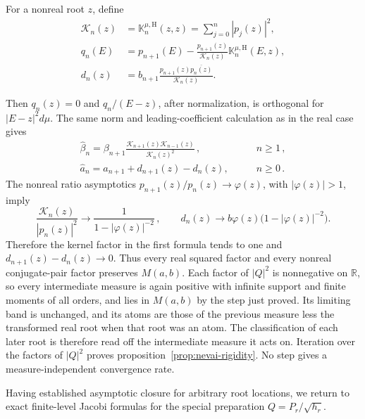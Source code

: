 \documentclass[a4paper,11pt]{article}
\def\dd{d}%
\theoremstyle{definition}
\theoremstyle{remark}
\newcommand{\dd}{\mathrm d}
\newcommand{\RR}{\mathbb R}
\begin{document}
For a nonreal root $z$, define
\begin{equation}
\begin{aligned}
   \mathcal K_n(z)&=\mathbb K_n^{\mu,\mathrm H}(z,z)=\sum_{j=0}^n|p_j(z)|^2,\\
   q_n(E)&=p_{n+1}(E)
      -\frac{p_{n+1}(z)}{\mathcal K_n(z)}
       \mathbb K_n^{\mu,\mathrm H}(E,z),\\
   d_n(z)&=b_{n+1}
      \frac{p_{n+1}(z)\overline{p_n(z)}}{\mathcal K_n(z)}.
\end{aligned}
   \label{eq:all-root-complex-kernel-app}
\end{equation}

Then $q_n(z)=0$ and $q_n/(E-z)$, after normalization, is orthogonal for
$|E-z|^2\dd\mu$.  The same norm and leading-coefficient calculation as in the real case gives
\begin{equation}
\begin{aligned}
   \widehat\beta_n
   =\beta_{n+1}\frac{\mathcal K_{n+1}(z)\mathcal K_{n-1}(z)}
      {\mathcal K_n(z)^2}\,,
   &\qquad n\ge1\,,\\
   \widehat a_n=a_{n+1}+d_{n+1}(z)-d_n(z),
   &\qquad n\ge0\,.
\end{aligned}
   \label{eq:all-root-complex-Jacobi-app}
\end{equation}
The nonreal ratio asymptotics
$p_{n+1}(z)/p_n(z)\to\varphi(z)$, with $|\varphi(z)|>1$, imply
\begin{equation}
   \frac{\mathcal K_n(z)}{|p_n(z)|^2}
   \longrightarrow\frac{1}{1-|\varphi(z)|^{-2}}\,,
   \qquad
   d_n(z)\longrightarrow b\varphi(z)
      \bigl(1-|\varphi(z)|^{-2}\bigr).
   \label{eq:all-root-complex-ratio-limit-app}
\end{equation}
Therefore the kernel factor in the first formula tends to one and
$d_{n+1}(z)-d_n(z)\to0$.  Thus every real squared factor and every nonreal conjugate-pair factor
preserves $M(a,b)$.  Each factor of $|Q|^2$ is nonnegative on $\RR$, so every intermediate measure is again positive
with infinite support and finite moments of all orders, and lies in $M(a,b)$ by the step just
proved. Its limiting band is unchanged, and its atoms are those of the previous measure less the
transformed real root when that root was an atom.  The classification of each later root is
therefore read off the intermediate measure it acts on. Iteration over the factors of $|Q|^2$ proves
proposition~\ref{prop:nevai-rigidity}.  No step gives a measure-independent convergence rate.

Having established asymptotic closure for arbitrary root locations, we return to exact
finite-level Jacobi formulas for the special preparation $Q=P_r/\sqrt{h_r}$.
\end{document}
